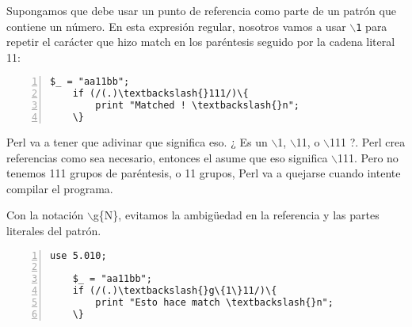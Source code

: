 Supongamos que debe usar un punto de referencia como parte de un patrón que contiene un número. En esta expresión regular, nosotros vamos a usar \texttt{$\backslash$1} para repetir el carácter que hizo match en los paréntesis seguido por la cadena literal 11:

\vspace{-6pt}
\small
\begin{Verbatim}[commandchars=\\\{\},numbers=left]
    $_ = "aa11bb";
    if (/(.)\textbackslash{}111/)\{
        print "Matched ! \textbackslash{}n"; 
    \}
\end{Verbatim}
\vspace{-6pt}
\normalsize
Perl va a tener que adivinar que signif\mbox{}ica eso. ¿ Es un $\backslash$1, $\backslash$11, o $\backslash$111 ?. Perl crea referencias como sea necesario, entonces el asume que eso signif\mbox{}ica $\backslash$111. Pero no tenemos 111 grupos de paréntesis, o 11 grupos, Perl va a quejarse cuando intente compilar el programa.

Con la notación $\backslash$g\{N\}, evitamos la ambigüedad en la referencia y las partes literales del patrón.

\vspace{-6pt}
\small
\begin{Verbatim}[commandchars=\\\{\},numbers=left]
    use 5.010;

    $_ = "aa11bb";
    if (/(.)\textbackslash{}g\{1\}11/)\{
        print "Esto hace match \textbackslash{}n";
    \}
\end{Verbatim}
\vspace{-6pt}
\normalsize

